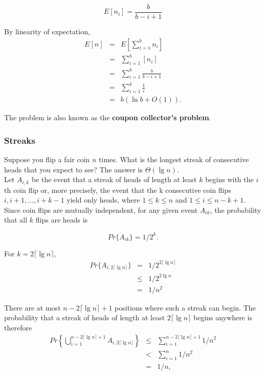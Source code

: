 \documentclass[12pt]{article}
\begin{document}
\begin{equation*}
  E[n_i] = \frac {b}{b - i + 1}
\end{equation*}

By linearity of expectation,
\begin{eqnarray*}
  E[n]
  &=& E \left[ \sum_{i=1}^b n_i  \right] \\
  &=& \sum_{i=1}^b [n_i] \\
  &=& \sum_{i=1}^b \frac {b}{b-i+1} \\
  &=& \sum_{i=1}^b \frac {1}{i} \\
  &=& b( \ln b + O(1)).
\end{eqnarray*}

The problem is also known as the \textbf {coupon collector's problem}.

\subsubsection{Streaks}

Suppose you flip a fair coin $n$ times. What is the longest streak of consecutive heads that you expect to see? The answer is $\Theta (\lg n)$. \\

Let $A_{i,k}$ be the event that a streak of heads of length at least $k$ begins with the $i$th coin flip or, more precisely, the event that the k consecutive coin flips $i, i + 1, \dots, i + k -1$ yield only heads, where $1 \le k \le n$ and $1 \le i \le n - k + 1$. Since coin flips are mutually independent, for any given event $A_{ik}$, the probability that all $k$ flips are heads is

\begin{equation*}
  Pr \{ A_{ik} \} = 1 / 2^k.
\end{equation*}

For $k = 2 \lceil \lg n \rceil$,
\begin{eqnarray*}
  Pr \{ A_{i, 2 \lceil \lg n \rceil} \}
  &=& 1 / 2^{2 \lceil \lg n \rceil} \\
  &\le& 1 / 2^{2 \lg n} \\
  &=& 1 / n^2
\end{eqnarray*}

There are at most $n - 2 \lceil \lg n \rceil + 1$ positions where such a streak can begin. The probability that a streak of heads of length at least $2 \lceil \lg n \rceil$ begins anywhere is therefore
\begin{eqnarray*}
  Pr \left\{ \bigcup_{i=1}^{n - 2 \lceil \lg n \rceil + 1} A_{i,2 \lceil \lg n \rceil} \right\}
  &\le&  \sum_{i=1}^{n - 2 \lceil \lg n \rceil + 1} 1 / n^2 \\
  &<& \sum_{i=1}^n 1 / n^2 \\
  &=& 1/n,
\end{eqnarray*}
\end{document}
